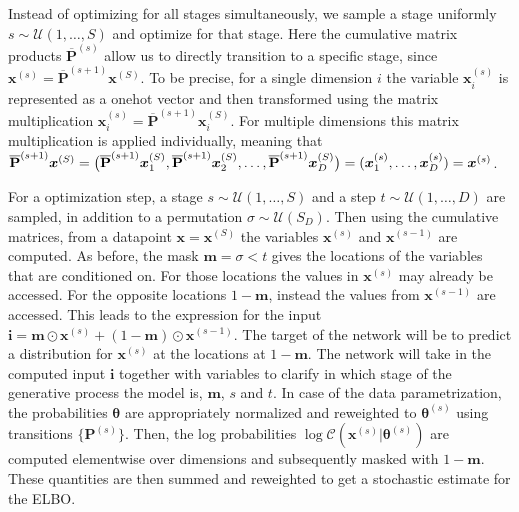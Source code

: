 \documentclass{article} \usepackage{iclr2022_conference,times}
\def\vi{{\bm{i}}}
\def\vm{{\bm{m}}}
\def\vx{{\bm{x}}}
\begin{document}
Instead of optimizing for all stages simultaneously, we sample a stage uniformly $s \sim \mathcal{U}(1, \ldots, S)$ and optimize for that stage. Here the cumulative matrix products $\overline{\mathbf{P}}^{(s)}$ allow us to directly transition to a specific stage, since $\vx^{(s)} = \overline{\mathbf{P}}^{(s+1)} \vx^{(S)}$. To be precise, for a single dimension $i$ the variable $\vx_i^{(s)}$ is represented as a onehot vector and then transformed using the matrix multiplication $\vx_i^{(s)} = \overline{\mathbf{P}}^{(s+1)} \vx_i^{(S)}$. For multiple dimensions this matrix multiplication is applied individually, meaning that $\overline{\mathbf{P}}^{(s+1)} \vx^{(S)} = \big{(}\overline{\mathbf{P}}^{(s+1)} \vx_1^{(S)},\overline{\mathbf{P}}^{(s+1)} \vx_2^{(S)}, \ldots, \overline{\mathbf{P}}^{(s+1)} \vx_D^{(S)}\big{)} = (\vx_1^{(s)}, \ldots, \vx_D^{(s)}) = \vx^{(s)}$.


For a optimization step, a stage $s \sim \mathcal{U}(1, \ldots, S)$ and a step $t \sim \mathcal{U}(1, \ldots, D)$ are sampled, in addition to a permutation $\sigma \sim \mathcal{U}(S_D)$. Then using the cumulative matrices, from a datapoint $\vx = \vx^{(S)}$ the variables $\vx^{(s)}$ and $\vx^{(s-1)}$ are computed. As before, the mask $\vm = \sigma < t$ gives the locations of the variables that are conditioned on. For those locations the values in $\vx^{(s)}$ may already be accessed. For the opposite locations $1 - \vm$, instead the values from $\vx^{(s-1)}$ are accessed. This leads to the expression for the input $\vi = \vm \odot \vx^{(s)} + (1 - \vm) \odot \vx^{(s-1)}$. The target of the network will be to predict a distribution for $\vx^{(s)}$ at the locations at $1 - \vm$. The network will take in the computed input $\vi$ together with variables to clarify in which stage of the generative process the model is, $\vm$, $s$ and $t$. In case of the data parametrization, the probabilities $\boldsymbol{\theta}$ are appropriately normalized and reweighted to $\boldsymbol{\theta}^{(s)}$ using transitions $\{\mathbf{P}^{(s)}\}$. Then, the log probabilities $\log \mathcal{C}(\vx^{(s)} | \boldsymbol{\theta}^{(s)})$ are computed elementwise over dimensions and subsequently masked with $1 - \vm$. These quantities are then summed and reweighted to get a stochastic estimate for the ELBO.
\end{document}
